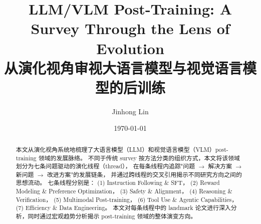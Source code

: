 \documentclass[12pt,a4paper]{article}
\title{\textbf{LLM/VLM Post-Training: A Survey Through the Lens of Evolution}\\
\large{从演化视角审视大语言模型与视觉语言模型的后训练}}
\author{Jinhong Lin}
\date{\today}
\begin{document}
\maketitle

\begin{abstract}
本文从演化视角系统地梳理了大语言模型（LLM）和视觉语言模型（VLM）post-training 领域的发展脉络。
不同于传统 survey 按方法分类的组织方式，本文将该领域划分为七条问题驱动的演化线程（thread），
在每条线程内追踪"问题 $\rightarrow$ 解决方案 $\rightarrow$ 新问题 $\rightarrow$ 改进方案"的发展链条，
并通过跨线程的交叉引用揭示不同研究方向之间的思想流动。
七条线程分别是：
(1) Instruction Following \& SFT，
(2) Reward Modeling \& Preference Optimization，
(3) Safety \& Alignment，
(4) Reasoning \& Verification，
(5) Multimodal Post-training，
(6) Tool Use \& Agentic Capabilities，
(7) Efficiency \& Data Engineering。
本文对每条线程中的 landmark 论文进行深入分析，同时通过宏观趋势分析揭示 post-training 领域的整体演变方向。
\end{abstract}

\tableofcontents
\newpage





















\end{document}
